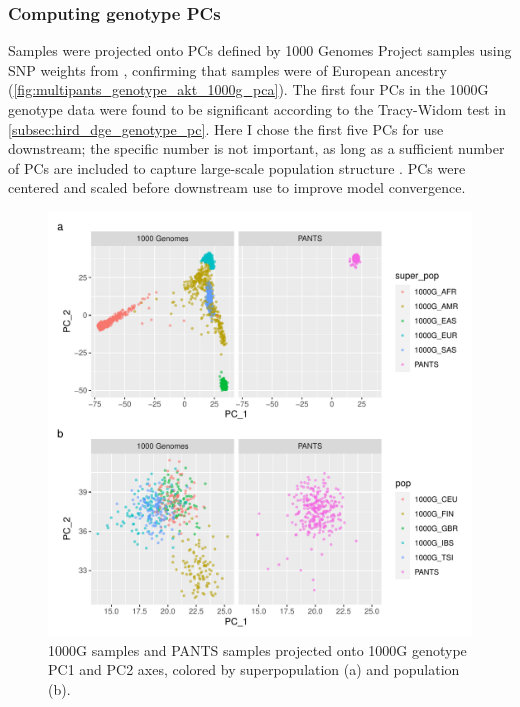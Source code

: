 \subsubsection{Computing genotype PCs}

Samples were projected onto \glspl{PC} defined by 1000 Genomes Project samples using \gls{SNP} weights from ,
confirming that samples were of European ancestry (\autoref{fig:multipants_genotype_akt_1000g_pca}).
The first four \glspl{PC} in the 1000G genotype data were found to be significant according to the Tracy-Widom test in \autoref{subsec:hird_dge_genotype_pc}.
Here I chose the first five \glspl{PC} for use downstream;
the specific number is not important, as long as a sufficient number of \glspl{PC} are included to capture large-scale population structure \autocite{price2006PrincipalComponentsAnalysis}.
\glspl{PC} were centered and scaled before downstream use to improve model convergence.


\begin{figure}
    \centering
    \includegraphics[width=1.0\textwidth,page=1]{mainmatter/figures/chapter_04/pants_samples.sampleids_cleaned_to_lowercase.filtered.GRCh38.sorted.multiPANTS.projection_1000G_pca.pdf}
    \caption{1000G samples and PANTS samples projected onto 1000G genotype PC1 and PC2 axes, colored by superpopulation (a) and population (b).}
    \label{fig:multipants_genotype_akt_1000g_pca}
\end{figure}

